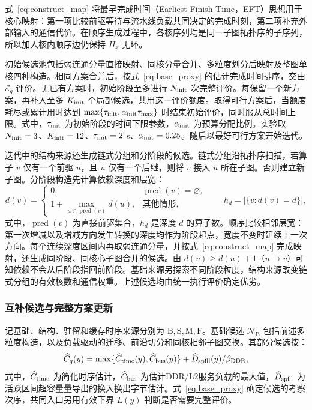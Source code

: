 式~\eqref{eq:construct_map} 将最早完成时间（Earliest Finish Time，EFT）思想\cite{A01}用于核心映射：第一项比较前驱等待与流水线负载共同决定的完成时刻，第二项补充外部输入的通信代价。在顺序生成过程中，各核序列均是同一子图拓扑序的子序列，所以加入核内顺序边仍保持 $H_x$ 无环。

初始候选池包括弱连通分量直接映射、同核分量合并、多粒度划分后映射及整图单核四种构造。相同方案合并后，按式~\eqref{eq:base_proxy} 的估计完成时间排序，交由 $\mathcal E_q$ 评价。无已有方案时，初始阶段至多进行 $N_{\rm init}$ 次完整评价。每保留一个新方案，再补入至多 $K_{\rm init}$ 个局部候选，共用这一评价额度。取得可行方案后，当额度耗尽或累计用时达到 $\max\{\tau_{\rm init},\alpha_{\rm init}\tau_{\max}\}$ 时结束初始评价，同时服从总时间上限。式中，$\tau_{\rm init}$ 为初始阶段的时间下限参数，$\alpha_{\rm init}$ 为预算分配比例。实验取 $N_{\rm init}=3$、$K_{\rm init}=12$、$\tau_{\rm init}=2$ s、$\alpha_{\rm init}=0.25$。随后以最好可行方案开始迭代。

迭代中的结构来源还生成链式分组和分阶段的候选。链式分组沿拓扑序扫描，若算子 $v$ 仅有一个前驱 $u$，且 $u$ 仅有一个后继，则将 $v$ 接入 $u$ 所在子图。否则建立新子图。分阶段构造先计算依赖深度和层宽：
\begin{equation}
 d(v)=\begin{cases}0,&\operatorname{pred}(v)=\varnothing,\\
 1+\max_{u\in\operatorname{pred}(v)}d(u),&\text{其他情形},\end{cases}
 \qquad h_d=|\{v:d(v)=d\}|,
 \label{eq:depth_width}
\end{equation}
\noindent 式中，$\operatorname{pred}(v)$ 为直接前驱集合，$h_d$ 是深度 $d$ 的算子数。顺序比较相邻层宽：第一次增减以及增减方向发生转换的深度均作为阶段起点，宽度不变时延续上一次方向。每个连续深度区间内再取弱连通分量，并按式~\eqref{eq:construct_map} 完成映射，还生成同阶段、同核心子图合并的候选。由 $d(v)\ge d(u)+1$（$u\to v$）可知依赖不会从后阶段指回前阶段。基础来源另探索不同阶段粒度，结构来源改变链式分组的有效核数和通信权重。上述候选均由统一执行评价确定优劣。

\subsubsection{互补候选与完整方案更新}
记基础、结构、驻留和缓存时序来源分别为 $\mathrm B,\mathrm S,\mathrm M,\mathrm F$。基础候选 $\mathcal N_{\mathrm B}$ 包括前述多粒度构造，以及负载驱动的迁移、前沿切分和同核相邻子图交换。其部分候选按：
\begin{equation}
 \widehat C_q(y)=\max\{\widehat C_{\rm time}(y),\widehat C_{\rm bus}(y)\}
       +\widehat D_{\rm spill}(y)/\beta_{\mathrm{DDR}},
 \label{eq:base_proxy}
\end{equation}
\noindent 式中，$\widehat C_{\rm time}$ 为简化时序估计，$\widehat C_{\rm bus}$ 为估计DDR/L2服务负载的最大值，$\widehat D_{\rm spill}$ 为活跃区间超容量量导出的换入换出字节估计。式~\eqref{eq:base_proxy} 确定候选的考察次序，共同入口另用有效下界 $L(y)$ 判断是否需要完整评价。

